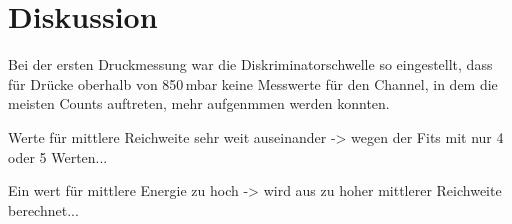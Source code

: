 \section{Diskussion}
\label{sec:Diskussion}

Bei der ersten Druckmessung war die Diskriminatorschwelle so eingestellt, dass
für Drücke oberhalb von 850\,mbar keine Messwerte für den Channel, in dem die
meisten Counts auftreten, mehr aufgenmmen werden konnten.


Werte für mittlere Reichweite sehr weit auseinander -> wegen der Fits mit nur 4
oder 5 Werten...

Ein wert für mittlere Energie zu hoch -> wird aus zu hoher mittlerer Reichweite 
berechnet...
